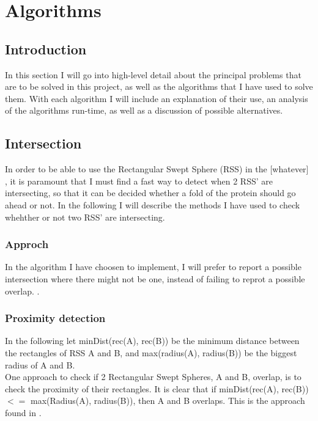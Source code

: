 
\section{Algorithms}
\label{algorithms}

\subsection{Introduction}
In this section I will go into high-level detail about the principal problems that are to be solved in this project, as well as the algorithms that I have used to solve them. With each algorithm I will include an explanation of their use, an analysis of the algorithms run-time, as well as a discussion of possible alternatives. 

\subsection{Intersection}
In order to be able to use the Rectangular Swept Sphere (RSS) in the [whatever] , it is paramount that I must find a fast way to detect when 2 RSS' are intersecting, so that it can be decided whether a fold of the protein should go ahead or not. In the following I will describe the methods I have used to check whehther or not two RSS' are intersecting.

\subsubsection{Approch}
In the algorithm I have choosen to implement, I will prefer to report a possible intersection where there might not be one, instead of failing to reprot a possible overlap. .

\subsubsection{Proximity detection}
In the following let minDist(rec(A), rec(B)) be the minimum distance between the rectangles of RSS A and B, and max(radius(A), radius(B)) be the biggest radius of A and B.\\

One approach to check if 2 Rectangular Swept Spheres, A and B, overlap, is to check the proximity of their rectangles. It is clear that if minDist(rec(A), rec(B)) $<=$ max(Radius(A), radius(B)), then A and B overlaps. This is the approach found in \cite{Larsen99fastproximity}.

